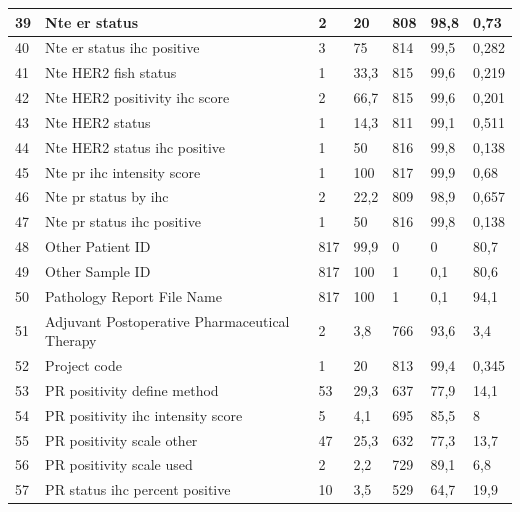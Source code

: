 \begin{table}[!htb]
\begin{threeparttable}
\begin{tabular}{p{0.5cm} p{4cm} p{1.5cm} p{2cm} p{1.5cm} p{2cm} p{1.5cm}}
			\\ \hline	39	&	Nte er status	&	2	&	20	&	808	&	98,8	&	0,73
			\\ \hline	40	&	Nte er status ihc positive	&	3	&	75	&	814	&	99,5	&	0,282
			\\ \hline	41	&	Nte HER2 fish status	&	1	&	33,3	&	815	&	99,6	&	0,219
			\\ \hline	42	&	Nte HER2 positivity ihc score	&	2	&	66,7	&	815	&	99,6	&	0,201
			\\ \hline	43	&	Nte HER2 status	&	1	&	14,3	&	811	&	99,1	&	0,511
			\\ \hline	44	&	Nte HER2 status ihc positive	&	1	&	50	&	816	&	99,8	&	0,138
			\\ \hline	45	&	Nte pr ihc intensity score	&	1	&	100	&	817	&	99,9	&	0,68
			\\ \hline	46	&	Nte pr status by ihc	&	2	&	22,2	&	809	&	98,9	&	0,657
			\\ \hline	47	&	Nte pr status ihc positive	&	1	&	50	&	816	&	99,8	&	0,138
			\\ \hline	48	&	Other Patient ID	&	817	&	99,9	&	0	&	0	&	80,7
			\\ \hline	49	&	Other Sample ID	&	817	&	100	&	1	&	0,1	&	80,6
			\\ \hline	50	&	Pathology Report File Name	&	817	&	100	&	1	&	0,1	&	94,1
			\\ \hline	51	&	Adjuvant Postoperative Pharmaceutical Therapy 	&	2	&	3,8	&	766	&	93,6	&	3,4
			\\ \hline	52	&	Project code	&	1	&	20	&	813	&	99,4	&	0,345
			\\ \hline	53	&	PR positivity define method	&	53	&	29,3	&	637	&	77,9	&	14,1
			\\ \hline	54	&	PR positivity ihc intensity score	&	5	&	4,1	&	695	&	85,5	&	8
			\\ \hline	55	&	PR positivity scale other	&	47	&	25,3	&	632	&	77,3	&	13,7
			\\ \hline	56	&	PR positivity scale used	&	2	&	2,2	&	729	&	89,1	&	6,8
			\\ \hline	57	&	PR status ihc percent positive	&	10	&	3,5	&	529	&	64,7	&	19,9
			\\ \hline
		\end{tabular}
	\end{threeparttable}
\end{table}
\clearpage
